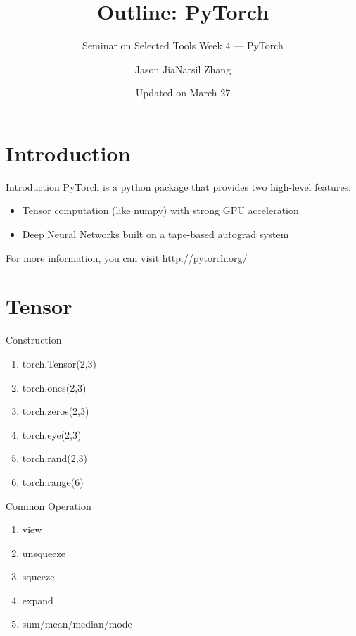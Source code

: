 \documentclass[english, nochinese]{../TeXTemplate/pkuslide}
\title{Outline: PyTorch}
\subtitle{Seminar on Selected Tools Week 4 --- PyTorch}
\author{Jason Jia\qquad Narsil Zhang}
\date{Updated on March 27}
\begin{document}
\begin{frame}
\titlepage
\end{frame}

\begin{frame}
\tableofcontents[subsectionstyle=show]
\end{frame}

\section{Introduction}

\begin{frame}
\sectionpage
\end{frame}

\begin{frame}{Introduction}
PyTorch is a python package that provides two high-level features:
\begin{itemize}
\item Tensor computation (like numpy) with strong GPU acceleration
\item Deep Neural Networks built on a tape-based autograd system
\end{itemize}
For more information, you can visit \url{http://pytorch.org/}
\end{frame}

\section{Tensor}

\begin{frame}
\sectionpage
\end{frame}

\begin{frame}{Construction}
\begin{enumerate}
    \item torch.Tensor(2,3)
    \item torch.ones(2,3)
    \item torch.zeros(2,3)
    \item torch.eye(2,3)
    \item torch.rand(2,3)
    \item torch.range(6)
\end{enumerate}
\end{frame}

\begin{frame}{Common Operation}
\begin{enumerate}
    \item view
	\item unsqueeze
	\item squeeze
	\item expand
	\item sum/mean/median/mode
\end{enumerate}
\end{frame}
\end{document}

